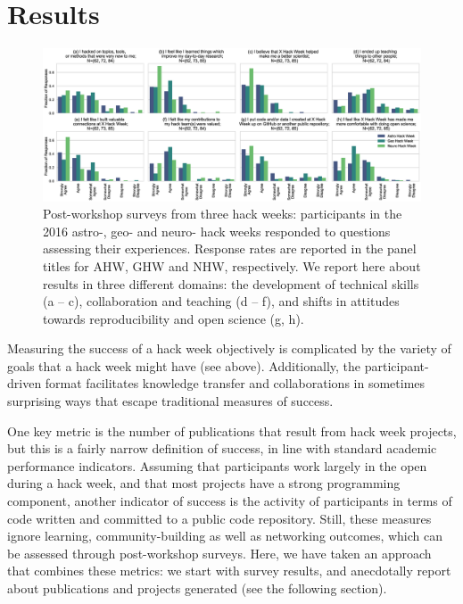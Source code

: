 \section*{Results}

\begin{figure}[h!]
\centering
\includegraphics[width=\textwidth]{f2.eps}
\caption{Post-workshop surveys from three hack weeks: participants in the 2016 astro-, geo- and neuro- hack weeks responded to questions assessing their experiences. Response rates are reported in the panel titles for AHW, GHW and NHW, respectively. We report here about results in three different domains: the development of technical skills (a -- c), collaboration and teaching (d -- f), and shifts in attitudes towards reproducibility and open science (g, h).}
\label{fig:survey}
\end{figure}

Measuring the success of a hack week objectively is complicated by the variety of goals that a hack week might have (see above).
Additionally, the participant-driven format facilitates knowledge transfer and collaborations in sometimes surprising ways that escape traditional measures of success.

One key metric is the number of publications that result from hack week projects, but this is a fairly narrow definition of success, in line with standard academic performance indicators.
Assuming that participants work largely in the open during a hack week, and that most projects have a strong programming component, another indicator of success is the activity of participants in terms of code written and committed to a public code repository.
Still, these measures ignore learning, community-building as well as networking outcomes, which can be assessed through post-workshop surveys.
Here, we have taken an approach that combines these metrics: we start with survey results, and anecdotally report about publications and projects generated (see the following section).

